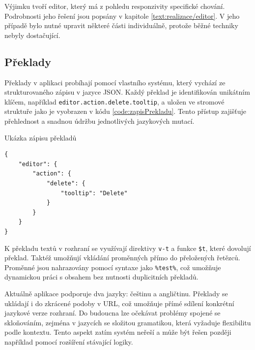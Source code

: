 Výjimku tvoří editor, který má z pohledu responzivity specifické chování. 
Podrobnosti jeho řešení jsou popsány v kapitole \ref{text:realizace/editor}. 
V jeho případě bylo nutné upravit některé části individuálně, protože běžné techniky nebyly dostačující.



\subsection{Překlady}

Překlady v aplikaci probíhají pomocí vlastního systému, který vychází ze strukturovaného zápisu v jazyce JSON. 
Každý překlad je identifikován unikátním klíčem, například \texttt{editor.action.delete.tooltip}, a uložen ve stromové struktuře jako je vyobrazen v kódu \ref{code:zapisPrekladu}.
Tento přístup zajišťuje přehlednost a snadnou údržbu jednotlivých jazykových mutací.


\begin{listing}[ht!]
\caption{Ukázka zápisu překladů}\label{code:zapisPrekladu}
\begin{verbatim}
{
    "editor": {
        "action": {
            "delete": {
                "tooltip": "Delete"
            }
        }
    }
}
\end{verbatim}
\end{listing}

K překladu textů v rozhraní se využívají direktivy \texttt{v-t} a funkce \texttt{\$t}, které dovolují překlad.
Taktéž umožňují vkládání proměnných přímo do přeložených řetězců. 
Proměnné jsou nahrazovány pomocí syntaxe jako \texttt{\%test\%}, což umožňuje dynamickou práci s obsahem bez nutnosti duplicitních překladů.

Aktuálně aplikace podporuje dva jazyky: češtinu a angličtinu. 
Překlady se ukládají i do zkrácené podoby v URL, což umožňuje přímé sdílení konkrétní jazykové verze rozhraní. 
Do budoucna lze očekávat problémy spojené se skloňováním, zejména v jazycích se složitou gramatikou, která vyžaduje flexibilitu podle kontextu. 
Tento aspekt zatím systém neřeší a může být řešen později například pomocí rozšíření stávající logiky.

